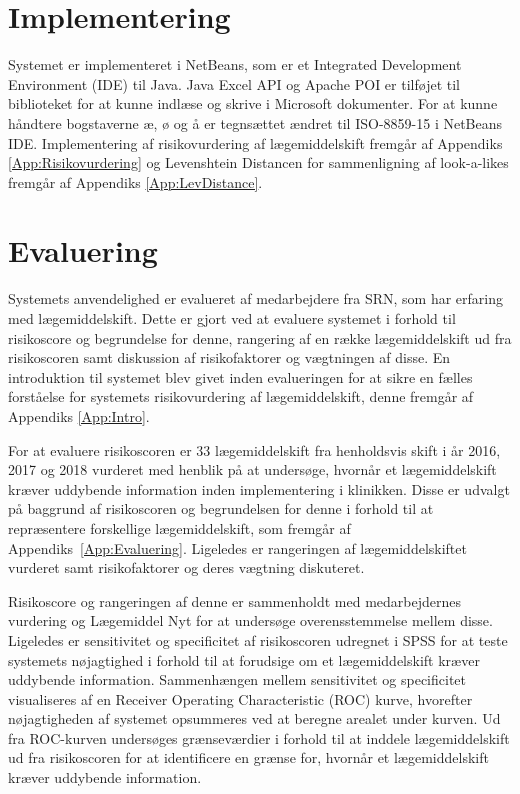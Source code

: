 \section{Implementering}
Systemet er implementeret i NetBeans, som er et Integrated Development Environment (IDE) til Java.  Java Excel API og Apache POI er tilføjet til biblioteket for at kunne indlæse og skrive i Microsoft dokumenter. For at kunne håndtere bogstaverne æ, ø og å er tegnsættet ændret til ISO-8859-15 i NetBeans IDE. Implementering af risikovurdering af lægemiddelskift fremgår af Appendiks \ref{App:Risikovurdering} og Levenshtein Distancen for sammenligning af look-a-likes fremgår af Appendiks \ref{App:LevDistance}.

\section{Evaluering}
Systemets anvendelighed er evalueret af medarbejdere fra SRN, som har erfaring med lægemiddelskift. Dette er gjort ved at evaluere systemet i forhold til risikoscore og begrundelse for denne, rangering af en række lægemiddelskift ud fra risikoscoren samt diskussion af risikofaktorer og vægtningen af disse. En introduktion til systemet blev givet inden evalueringen for at sikre en fælles forståelse for systemets risikovurdering af lægemiddelskift, denne fremgår af Appendiks \ref{App:Intro}. 

For at evaluere risikoscoren er 33 lægemiddelskift fra henholdsvis skift i år 2016, 2017 og 2018 vurderet med henblik på at undersøge, hvornår et lægemiddelskift kræver uddybende information inden implementering i klinikken. Disse er udvalgt på baggrund af risikoscoren og begrundelsen for denne i forhold til at repræsentere forskellige lægemiddelskift, som fremgår af Appendiks~\ref{App:Evaluering}. Ligeledes er rangeringen af lægemiddelskiftet vurderet samt risikofaktorer og deres vægtning diskuteret. 

Risikoscore og rangeringen af denne er sammenholdt med medarbejdernes vurdering og Lægemiddel Nyt for at undersøge overensstemmelse mellem disse. Ligeledes er sensitivitet og specificitet af risikoscoren udregnet i SPSS for at teste systemets nøjagtighed i forhold til at forudsige om et lægemiddelskift kræver uddybende information. Sammenhængen mellem sensitivitet og specificitet visualiseres af en Receiver Operating Characteristic (ROC) kurve, hvorefter nøjagtigheden af systemet opsummeres ved at beregne arealet under kurven. Ud fra ROC-kurven undersøges grænseværdier i forhold til at inddele lægemiddelskift ud fra risikoscoren for at identificere en grænse for, hvornår et lægemiddelskift kræver uddybende information.



